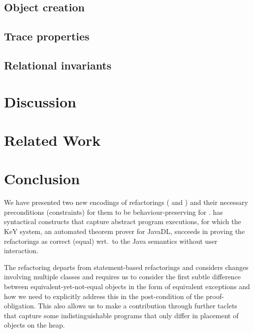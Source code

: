 \documentclass[runningheads]{llncs}
\begin{document}

\subsection{Object creation}\label{sec:objectcreation}


\subsection{Trace properties}\label{sec:traces}


\subsection{Relational invariants}\label{sec:relational}


\section{Discussion}\label{sec:discussion}


\section{Related Work}\label{sec:related}



\section{Conclusion}\label{sec:conclusion}

We have presented two new encodings of refactorings ( and ) and their necessary preconditions (constraints) for them to be behaviour-preserving for \Refinity{}.
\Refinity{} has syntactical constructs that capture abstract program executions, for which the KeY system,
an automated theorem prover for JavaDL, succeeds in proving the refactorings as correct (equal) wrt.\ to the Java semantics without user interaction.

The  refactoring departs from statement-based refactorings and considers changes involving multiple classes and requires us to consider the first subtle difference between equivalent-yet-not-equal objects in the form of equivalent exceptions and how we need to explicitly address this in the post-condition of the proof-obligation.
This also allows us to make a contribution through further taclets that capture some indistinguishable programs that only differ in placement of objects on the heap.
\end{document}
